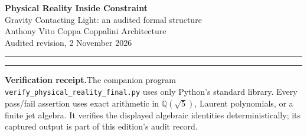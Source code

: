 \documentclass[10pt]{article}
\theoremstyle{remark}
\newcommand{\Ev}{\operatorname{Ev}}
\newcommand{\Id}{\mathsf{Id}}
\newcommand{\N}{\mathbb N}
\begin{document}
\begin{center}
{\LARGE\bfseries Physical Reality Inside Constraint}\\[3pt]
{\large Gravity Contacting Light: an audited formal structure}\\[8pt]
{\normalsize Anthony Vito Coppa \quad\textbar\quad Coppalini Architecture}\\[2pt]
{\small Audited revision, 2 November 2026}
\end{center}

\vspace{2pt}\hrule\vspace{8pt}

\begin{abstract}
This paper gives a receipt-preserving formal calculus with a typed address
space and an append-only registry.  The evaluation map
\(\Ev:P^*\to(\N_{>0},\times)\) is the surjective, non-injective
abelianization of ordered prime words; the root carrier
\[
G=\begin{pmatrix}-2&1\\1&2\end{pmatrix}
\]
satisfies \(G^2=5I\) and has split signature \((1,1)\); the inertia of
\(Q\otimes Q\) is \((2,2)\), while \(G\oplus I_2\) has inertia \((3,1)\);
the pp-wave curvature law, Fibonacci correction, and reduced Burau identities
hold under their stated conventions and hypotheses; and the future-boundary
registry \(\widehat K_n=H_n\sqcup\{\mathbf F\}\) preserves historical
receipts by append-only admission.

Its physical contact relation is
\[
G_{\mathrm{embodied}}=e,\qquad \Pi(e,\ell)=c,\qquad
c=(e,\ell,w,r),\qquad \Id(c)=(e,\ell,w,r).
\]
Here the embodied metric carrier \(e\) contacts light \(\ell\) at an ordered,
receipt-bearing address.  The formal results, supplied structures, contact
interfaces, and finite implementation are typed separately throughout.
\end{abstract}

\vspace{2pt}\hrule\vspace{6pt}

\textbf{Verification receipt.}\enspace The companion program
\texttt{verify\_physical\_reality\_final.py} uses only Python's standard
library.  Every pass/fail assertion uses exact arithmetic in
$\mathbb Q(\sqrt5)$, Laurent polynomials, or a finite jet algebra.  It
verifies the displayed algebraic identities deterministically; its captured
output is part of this edition's audit record.
\end{document}
